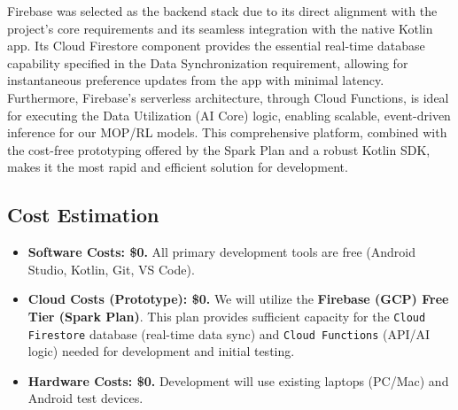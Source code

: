 \documentclass[conference]{IEEEtran}
\begin{document}
\begin{itemize}
\begin{figure}[h]
        \end{figure}\par
    Firebase was selected as the backend stack due to its direct alignment with the project's core requirements and its seamless integration with the native Kotlin app. Its Cloud Firestore component provides the essential real-time database capability specified in the Data Synchronization requirement, allowing for instantaneous preference updates from the app with minimal latency. Furthermore, Firebase's serverless architecture, through Cloud Functions, is ideal for executing the Data Utilization (AI Core) logic, enabling scalable, event-driven inference for our MOP/RL models. This comprehensive platform, combined with the cost-free prototyping offered by the Spark Plan and a robust Kotlin SDK, makes it the most rapid and efficient solution for development.\par
    
\end{itemize}

\subsection{Cost Estimation}
\begin{itemize}
    \item \textbf{Software Costs: \$0.} All primary development tools are free (Android Studio, Kotlin, Git, VS Code).
    \item \textbf{Cloud Costs (Prototype): \$0.} We will utilize the \textbf{Firebase (GCP) Free Tier (Spark Plan)}. This plan provides sufficient capacity for the \texttt{Cloud Firestore} database (real-time data sync) and \texttt{Cloud Functions} (API/AI logic) needed for development and initial testing.
    \item \textbf{Hardware Costs: \$0.} Development will use existing laptops (PC/Mac) and Android test devices.
\end{itemize}
\end{document}
